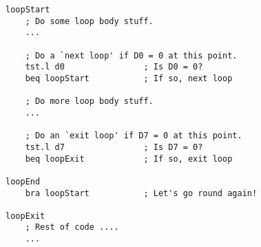 \begin{lstlisting}[caption={Exit and Next examples},label={lst: exit and next examples}]
loopStart
    ; Do some loop body stuff.
    ...
    
    ; Do a `next loop' if D0 = 0 at this point.
    tst.l d0                ; Is D0 = 0?
    beq loopStart           ; If so, next loop
    
    ; Do more loop body stuff.
    ...
    
    ; Do an `exit loop' if D7 = 0 at this point.
    tst.l d7                ; Is D7 = 0?
    beq loopExit            ; If so, exit loop  
    
loopEnd
    bra loopStart           ; Let's go round again!
    
loopExit
    ; Rest of code ....
    ...
\end{lstlisting}

